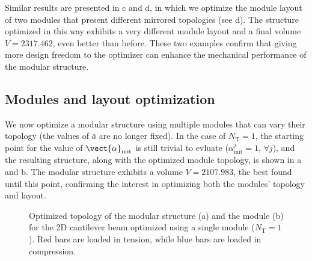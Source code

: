 Similar results are presented in c and d, in which we optimize the module layout of two modules that present different mirrored topologies (see d). The structure optimized in this way exhibits a very different module layout and a final volume $V = 2317.462$, even better than before. These two examples confirm that giving more design freedom to the optimizer can enhance the mechanical performance of the modular structure.

\subsection{Modules and layout optimization}
We now optimize a modular structure using multiple modules that can vary their topology (the values of $\bar{a}$ are no longer fixed). In the case of $N_\text{T}=1$, the starting point for the value of $\vect{\alpha}_\text{init}$ is still trivial to evluate ($\alpha^j_\text{init}=1, \, \forall j$), and the resulting structure, along with the optimized module topology, is shown in a and b. The modular structure exhibits a volume $V = 2107.983$, the best found until this point, confirming the interest in optimizing both the modules' topology and layout.

\begin{figure}
    \hspace*{\fill}
    \hfill
    \hspace*{\fill}
    \caption{Optimized topology of the modular structure (a) and the module (b) for the 2D cantilever beam optimized using a single module ($N_\text{T}=1$). Red bars are loaded in tension, while blue bars are loaded in compression.}
    \label{fig:06_module_topol_opt}
\end{figure}

